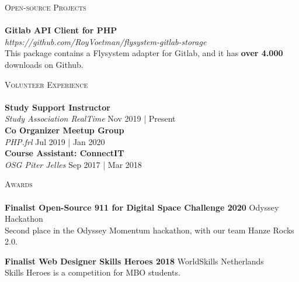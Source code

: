 \documentclass[a4paper]{article}
\newcommand{\lineunder} {
    \vspace*{-8pt} \\
    \hspace*{-18pt} \hrulefill \\
}
\newcommand{\header} [1] {
    {\hspace*{-18pt}\vspace*{6pt} \textsc{#1}}
    \vspace*{-6pt} \lineunder
}
\begin{document}
\vspace{5mm}

\header{Open-source Projects}
{\textbf{Gitlab API Client for PHP}} \\ \emph{https://github.com/RoyVoetman/flysystem-gitlab-storage}\\
This package contains a Flysystem adapter for Gitlab, and it has \textbf{over 4.000} downloads on Github.
\vspace*{2mm}

\vspace{5mm}

\header{Volunteer Experience}
\vspace{1mm}
\textbf{Study Support Instructor} \hfill\\
\textit{Study Association RealTime} \hfill Nov 2019 | Present\\
\vspace{2mm}
\textbf{Co Organizer Meetup Group} \hfill\\
\textit{PHP.frl} \hfill Jul 2019 | Jan 2020\\
\vspace{2mm}
\textbf{Course Assistant: ConnectIT} \hfill\\
\textit{OSG Piter Jelles} \hfill Sep 2017 | Mar 2018\\
\vspace{2mm}

\vspace{5mm}

\header{Awards}
\textbf{Finalist Open-Source 911 for Digital Space Challenge 2020} \hfill Odyssey Hackathon\\
Second place in the Odyssey Momentum hackathon, with our team Hanze Rocks 2.0.
\vspace*{2mm}

\textbf{Finalist Web Designer Skills Heroes 2018} \hfill WorldSkills Netherlands\\
Skills Heroes is a competition for MBO students.
\vspace*{2mm}

\ 
\end{document}
